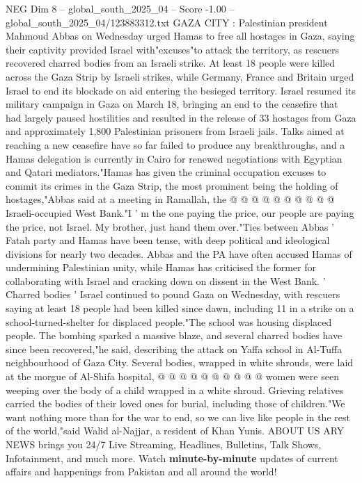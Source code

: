 \begin{textsample}{NEG Dim 8 – global\_south\_2025\_04 – Score -1.00 – global\_south\_2025\_04/123883312.txt}  \label{ex:f8_neg_283}
GAZA CITY : Palestinian president Mahmoud Abbas on Wednesday urged Hamas to free all hostages in Gaza, saying their captivity provided Israel with"excuses"to attack the territory, as rescuers recovered charred bodies from an Israeli strike.
At least 18 people were killed across the Gaza Strip by Israeli strikes, while Germany, France and Britain urged Israel to end its blockade on aid entering the besieged territory.
Israel resumed its military campaign in Gaza on March 18, bringing an end to the ceasefire that had largely paused hostilities and resulted in the release of 33 hostages from Gaza and approximately 1,800 Palestinian prisoners from Israeli jails.
Talks aimed at reaching a new ceasefire have so far failed to produce any breakthroughs, and a Hamas delegation is currently in Cairo for renewed negotiations with Egyptian and Qatari mediators."Hamas has given the criminal occupation excuses to commit its crimes in the Gaza Strip, the most prominent being the holding of hostages,"Abbas said at a meeting in Ramallah, the @ @ @ @ @ @ @ @ @ @ Israeli-occupied West Bank."I ' m the one paying the price, our people are paying the price, not Israel.
My brother, just hand them over."Ties between Abbas ' Fatah party and Hamas have been tense, with deep political and ideological divisions for nearly two decades.
Abbas and the PA have often accused Hamas of undermining Palestinian unity, while Hamas has criticised the former for collaborating with Israel and cracking down on dissent in the West Bank. ' Charred bodies ' Israel continued to pound Gaza on Wednesday, with rescuers saying at least 18 people had been killed since dawn, including 11 in a strike on a school-turned-shelter for displaced people."The school was housing displaced people.
The bombing sparked a massive blaze, and several charred bodies have since been recovered,"he said, describing the attack on Yaffa school in Al-Tuffa neighbourhood of Gaza City.
Several bodies, wrapped in white shrouds, were laid at the morgue of Al-Shifa hospital, @ @ @ @ @ @ @ @ @ @ women were seen weeping over the body of a child wrapped in a white shroud.
Grieving relatives carried the bodies of their loved ones for burial, including those of children."We want nothing more than for the war to end, so we can live like people in the rest of the world,"said Walid al-Najjar, a resident of Khan Yunis.
ABOUT US ARY NEWS brings you 24/7 Live Streaming, Headlines, Bulletins, Talk Shows, Infotainment, and much more.
Watch \textbf{minute-by-minute} updates of current affairs and happenings from Pakistan and all around the world!

\end{textsample}
